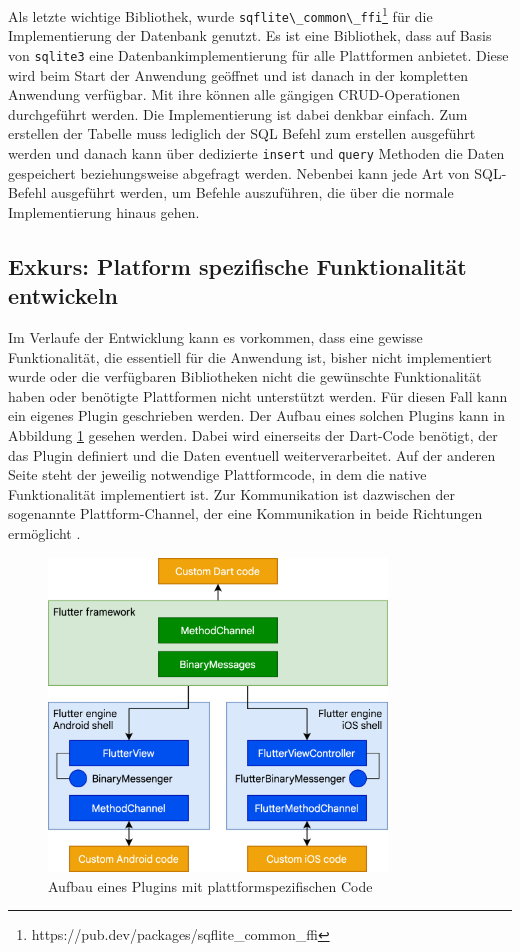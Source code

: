 Als letzte wichtige Bibliothek, wurde \verb|sqflite\_common\_ffi|\footnote{https://pub.dev/packages/sqflite\_common\_ffi} für die Implementierung der Datenbank genutzt. Es ist eine Bibliothek, dass auf Basis von \verb|sqlite3| eine Datenbankimplementierung für alle Plattformen anbietet.
Diese wird beim Start der Anwendung geöffnet und ist danach in der kompletten Anwendung verfügbar.
Mit ihre können alle gängigen \ac{CRUD}-Operationen durchgeführt werden. Die Implementierung ist dabei denkbar einfach.
Zum erstellen der Tabelle muss lediglich der SQL Befehl zum erstellen ausgeführt werden und danach kann über dedizierte \verb|insert| und \verb|query| Methoden die Daten gespeichert beziehungsweise abgefragt werden.
Nebenbei kann jede Art von SQL-Befehl ausgeführt werden, um Befehle auszuführen, die über die normale Implementierung hinaus gehen.


\subsection{Exkurs: Platform spezifische Funktionalität entwickeln}
Im Verlaufe der Entwicklung kann es vorkommen, dass eine gewisse Funktionalität, die essentiell für die Anwendung ist, bisher nicht implementiert wurde oder die verfügbaren Bibliotheken nicht die gewünschte Funktionalität haben oder benötigte Plattformen nicht unterstützt werden. Für diesen Fall kann ein eigenes Plugin geschrieben werden. Der Aufbau eines solchen Plugins kann in Abbildung \ref{fig:flutter_plattform_specific} gesehen werden. Dabei wird einerseits der Dart-Code benötigt, der das Plugin definiert und die Daten eventuell weiterverarbeitet. Auf der anderen Seite steht der jeweilig notwendige Plattformcode, in dem die native Funktionalität implementiert ist. Zur Kommunikation ist dazwischen der sogenannte Plattform-Channel, der eine Kommunikation in beide Richtungen ermöglicht \cite[Kapitel~12.3]{Flutter_Recipes}.

\begin{figure}[ht]
  \centering
  \includegraphics[width=9cm,keepaspectratio]{images/flutter-platform-channels.png} 
  \caption[Aufbau eines Plugins mit plattformspezifischen Code]{Aufbau eines Plugins mit plattformspezifischen Code\protect\footnotemark}
  \label{fig:flutter_plattform_specific}
\end{figure}

